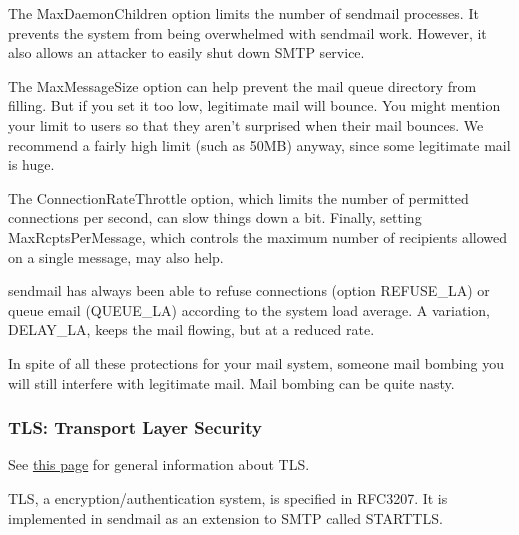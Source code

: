 The
\protect\hypertarget{part0026_split_038.htmlux5cux23_idIndexMarker2590}{}{}{MaxDaemonChildren}
option limits the number of {sendmail} processes. It prevents the system
from being overwhelmed with {sendmail} work. However, it also allows an
attacker to easily shut down SMTP service.

The
\protect\hypertarget{part0026_split_038.htmlux5cux23_idIndexMarker2591}{}{}{MaxMessageSize}
option can help prevent the mail queue directory from filling. But if
you set it too low, legitimate mail will bounce. You might mention your
limit to users so that they aren't surprised when their mail bounces. We
recommend a fairly high limit (such as 50MB) anyway, since some
legitimate mail is huge.

The
\protect\hypertarget{part0026_split_038.htmlux5cux23_idIndexMarker2592}{}{}{ConnectionRateThrottle}
option, which limits the number of permitted connections per second, can
slow things down a bit. Finally, setting {MaxRcptsPerMessage}, which
controls the maximum number of recipients allowed on a single message,
may also help.

{sendmail} has always been able to refuse connections (option
\protect\hypertarget{part0026_split_038.htmlux5cux23_idIndexMarker2593}{}{}{REFUSE\_LA})
or queue email
(\protect\hypertarget{part0026_split_038.htmlux5cux23_idIndexMarker2594}{}{}{QUEUE\_LA})
according to the system load average. A variation,
\protect\hypertarget{part0026_split_038.htmlux5cux23_idIndexMarker2595}{}{}{DELAY\_LA},
keeps the mail flowing, but at a reduced rate.

In spite of all these protections for your mail system, someone mail
bombing you will still interfere with legitimate mail. Mail bombing can
be quite nasty.

\subsubsection[TLS: Transport Layer
Security]{\texorpdfstring{\protect\hypertarget{part0026_split_038.htmlux5cux23_idTextAnchor1114}{}{}TLS:
Transport Layer Security}{TLS: Transport Layer Security}}

\leavevmode\hypertarget{part0026_split_038.htmlux5cux23_idContainer1170}{}%
See
\protect\hyperlink{part0037_split_040.htmlux5cux23_idTextAnchor1727}{this
page} for general information about TLS.

\protect\hypertarget{part0026_split_038.htmlux5cux23_idIndexMarker2596}{}{}\protect\hypertarget{part0026_split_038.htmlux5cux23_idIndexMarker2597}{}{}TLS,
a encryption/authentication system, is specified in RFC3207. It is
implemented in {sendmail} as an extension to SMTP called
\protect\hypertarget{part0026_split_038.htmlux5cux23_idIndexMarker2598}{}{}STARTTLS.

